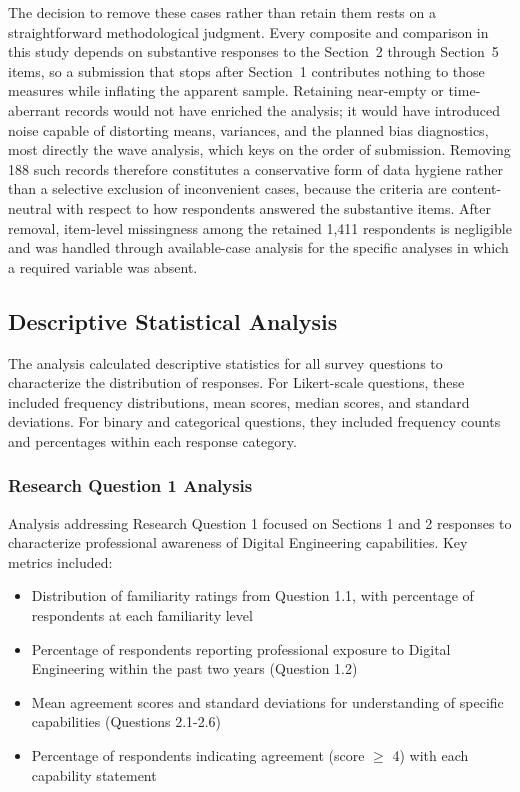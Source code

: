 The decision to remove these cases rather than retain them rests on a straightforward methodological judgment. Every composite and comparison in this study depends on substantive responses to the Section~2 through Section~5 items, so a submission that stops after Section~1 contributes nothing to those measures while inflating the apparent sample. Retaining near-empty or time-aberrant records would not have enriched the analysis; it would have introduced noise capable of distorting means, variances, and the planned bias diagnostics, most directly the wave analysis, which keys on the order of submission. Removing 188 such records therefore constitutes a conservative form of data hygiene rather than a selective exclusion of inconvenient cases, because the criteria are content-neutral with respect to how respondents answered the substantive items. After removal, item-level missingness among the retained 1{,}411 respondents is negligible and was handled through available-case analysis for the specific analyses in which a required variable was absent.

\subsection{Descriptive Statistical Analysis}

The analysis calculated descriptive statistics for all survey questions to characterize the distribution of responses. For Likert-scale questions, these included frequency distributions, mean scores, median scores, and standard deviations. For binary and categorical questions, they included frequency counts and percentages within each response category.

\subsubsection{Research Question 1 Analysis}

Analysis addressing Research Question 1 focused on Sections 1 and 2 responses to characterize professional awareness of Digital Engineering capabilities. Key metrics included:

\begin{itemize}
  \item Distribution of familiarity ratings from Question 1.1, with percentage of respondents at each familiarity level
  \item Percentage of respondents reporting professional exposure to Digital Engineering within the past two years (Question 1.2)
  \item Mean agreement scores and standard deviations for understanding of specific capabilities (Questions 2.1-2.6)
  \item Percentage of respondents indicating agreement (score \(\geq\) 4) with each capability statement
\end{itemize}

